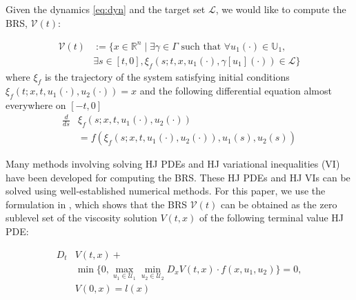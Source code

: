 Given the dynamics \eqref{eq:dyn} and the target set $\mathcal{L}$, we would like to compute the BRS, $\mathcal{V}(t)$:

\begin{equation}
\begin{aligned}
\mathcal{V}(t) &:= \{x\in\mathbb{R}^n \mid \exists \gamma\in\Gamma \text{ such that } \forall u_1(\cdot)\in\mathbb{U}_1, \\
&\exists s \in [t,0], \xi_f(s; t, x, u_1(\cdot), \gamma[u_1](\cdot)) \in \mathcal{L} \}
\end{aligned}
\end{equation}
where $\xi_f$ is the trajectory of the system satisfying initial conditions $\xi_f(t; x, t, u_1(\cdot), u_2(\cdot))=x$ and the following differential equation almost everywhere on $[-t, 0]$
\begin{equation}
\begin{aligned}
\frac{d}{ds}&\xi_f(s; x, t, u_1(\cdot), u_2(\cdot)) \\
&= f(\xi_f(s; x, t, u_1(\cdot), u_2(\cdot)), u_1(s), u_2(s))
\end{aligned}
\end{equation}

Many methods involving solving HJ PDEs \cite{Mitchell05} and HJ variational inequalities (VI) \cite{Bokanowski10,Barron89,Fisac15} have been developed for computing the BRS. These HJ PDEs and HJ VIs can be solved using well-established numerical methods. For this paper, we use the formulation in \cite{Mitchell05}, which shows that the BRS $\mathcal{V}(t)$ can be obtained as the zero sublevel set of the viscosity solution \cite{Crandall84} $V(t,x)$ of the following terminal value HJ PDE:

\begin{equation} \label{eq:HJIPDE}
\begin{aligned}
D_t &V(t,x) + \\
&\min \{0, \max_{u_1\in\mathcal{U}_1} \min_{u_2\in\mathcal{U}_2} D_x V(t,x) \cdot f(x,u_1,u_2) \} = 0, \\
&V(0,x) = l(x)
\end{aligned}
\end{equation}

